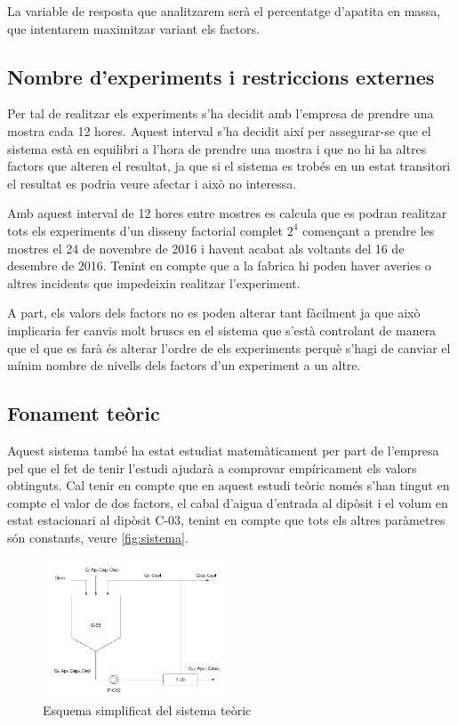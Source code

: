 \documentclass[a4paper]{article}
\begin{document}
La variable de resposta que analitzarem serà el percentatge d'apatita en massa, que intentarem maximitzar variant els factors.


\subsection{Nombre d'experiments i restriccions externes}
Per tal de realitzar els experiments s'ha decidit amb l'empresa de prendre una mostra cada 12 hores. Aquest interval s'ha decidit així per assegurar-se que el sistema està en equilibri a l'hora de prendre una mostra i que no hi ha altres factors que alteren el resultat, ja que si el sistema es trobés en un estat transitori el resultat es podria veure afectar i això no interessa.

Amb aquest interval de 12 hores entre mostres es calcula que es podran realitzar tots els experiments d'un disseny factorial complet $2^4$ començant a prendre les mostres el 24 de novembre de 2016 i havent acabat als voltants del 16 de desembre de 2016. Tenint en compte que a la fabrica hi poden haver averies o altres incidents que impedeixin realitzar l'experiment.

A part, els valors dels factors no es poden alterar tant fàcilment ja que això implicaria fer canvis molt bruscs en el sistema que s'està controlant de manera que el que es farà és alterar l'ordre de els experiments perquè s'hagi de canviar el mínim nombre de nivells dels factors d'un experiment a un altre.

\subsection{Fonament teòric}
Aquest sistema també ha estat estudiat matemàticament per part de l'empresa pel que el fet de tenir l'estudi ajudarà a comprovar empíricament els valors obtinguts. Cal tenir en compte que en aquest estudi teòric només s'han tingut en compte el valor de dos factors, el cabal d'aigua d'entrada al dipòsit i el volum en estat estacionari al dipòsit C-03, tenint en compte que tots els altres paràmetres són constants, veure \autoref{fig:sistema}.

\begin{figure}[H]
		\centering
		\includegraphics[width=0.5\textwidth]{images/graphs/sistema}
		\caption{Esquema simplificat del sistema teòric}
		\label{fig:sistema}
\end{figure}
\end{document}
